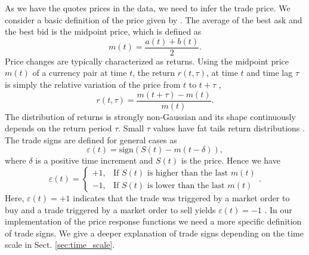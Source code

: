 As we have the quotes prices in the data, we need to infer the trade price. We
consider a basic definition of the price given by
\cite{forex_liquidity,patterns_forex,political_forex}. The average of the best
ask and the best bid is the midpoint price, which is defined as
\cite{teach_spread,subtle_nature,Bouchaud_2004,my_paper_response_financial,prop_order_book,stat_theory,large_prices_changes,em_stylized_facts}
\begin{equation}
    m \left(t\right) = \frac{a\left(t\right) + b\left(t\right)}{2}.
\end{equation}
Price changes are typically characterized as returns. Using the midpoint price
$m\left( t\right)$ of a currency pair at time $t$, the return
$r\left(t, \tau\right)$, at time $t$ and time lag $\tau$ is simply the relative
variation of the price from $t$ to $t + \tau$
\cite{subtle_nature,empirical_facts,asynchrony_effects_corr,tick_size_impact,causes_epps_effect,non_stationarity},
\begin{equation}\label{eq:midpoint_price_return}
    r\left(t,\tau\right) = \frac{m\left(t+\tau\right)-m\left(t\right)}
    {m\left(t\right)}.
\end{equation}
The distribution of returns is strongly non-Gaussian and its shape continuously
depends on the return period $\tau$. Small $\tau$ values have fat tails return
distributions \cite{subtle_nature}. The trade signs are defined for general
cases as
\begin{equation}\label{eq:trade_sign_general}
    \varepsilon\left(t\right)=\text{sign}\left(S\left(t\right)
    -m\left(t-\delta\right)\right),
\end{equation}
where $\delta$ is a positive time increment and $S\left(t\right)$ is the price.
Hence we have
\begin{equation}\label{eq:trade_sign_results}
    \varepsilon\left(t\right)=\left\{
    \begin{array}{cc}
    +1, & \text{If } S\left(t\right)
    \text{ is higher than the last } m\left( t \right)\\
    -1, & \text{If } S\left(t\right)
    \text{ is lower than the last } m\left( t \right)
    \end{array}\right. .
\end{equation}
Here, $\varepsilon(t) = +1$ indicates that the trade was triggered by a market
order to buy and a trade triggered by a market order to sell yields
$\varepsilon(t) = -1$
\cite{subtle_nature,Bouchaud_2004,spread_changes_affect,quant_stock_price_response,order_flow_persistent}.
In our implementation of the price response functions we need a more specific
definition of trade signs. We give a deeper explanation of trade signs
depending on the time scale in Sect. \ref{sec:time_scale}.

